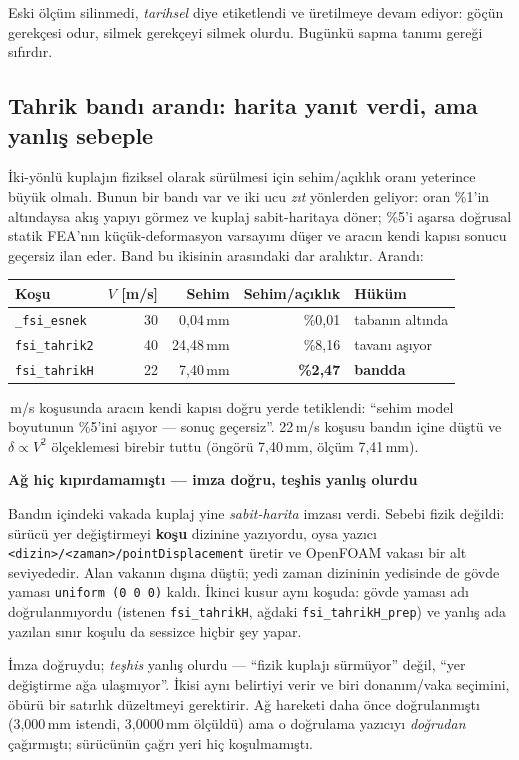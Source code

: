 \documentclass[11pt,a4paper]{article}
\newcommand{\kkkenar}{lacivert}
\newcommand{\kkzemin}{kod}
\newenvironment{renkkutu}[3]{%
  \renewcommand{\kkkenar}{#1}\renewcommand{\kkzemin}{#2}%
  \par\medskip\noindent
  \begin{lrbox}{\kutugovde}%
  \begin{minipage}{\dimexpr\linewidth-2\fboxsep-2\fboxrule\relax}\footnotesize
  \textcolor{#1}{\textbf{#3}}\par\vspace{3pt}%
}{%
  \end{minipage}%
  \end{lrbox}%
  \noindent\fcolorbox{\kkkenar}{\kkzemin}{\usebox{\kutugovde}}%
  \par\medskip
}
\newenvironment{dikkat}[1]{\begin{renkkutu}{orta}{ortabg}{#1}}{\end{renkkutu}}
\begin{document}
\noindent Eski ölçüm silinmedi, \emph{tarihsel} diye etiketlendi ve
üretilmeye devam ediyor: göçün gerekçesi odur, silmek gerekçeyi silmek
olurdu. Bugünkü sapma tanımı gereği sıfırdır.

\subsection{Tahrik bandı arandı: harita yanıt verdi, ama yanlış sebeple}
\label{sub:fsi-tahrik}

İki-yönlü kuplajın fiziksel olarak sürülmesi için sehim/açıklık oranı yeterince
büyük olmalı. Bunun bir bandı var ve iki ucu \emph{zıt} yönlerden geliyor:
oran \%1'in altındaysa akış yapıyı görmez ve kuplaj sabit-haritaya döner; \%5'i
aşarsa doğrusal statik FEA'nın küçük-deformasyon varsayımı düşer ve aracın
kendi kapısı sonucu geçersiz ilan eder. Band bu ikisinin arasındaki dar
aralıktır. Arandı:

\begin{center}\footnotesize
\begin{tabular}{@{}lrrrl@{}}
\toprule
Koşu & $V$ [m/s] & Sehim & Sehim/açıklık & Hüküm \\
\midrule
\texttt{\_fsi\_esnek}   & 30 & 0{,}04\,mm  & \%0{,}01 & tabanın altında \\
\texttt{fsi\_tahrik2}   & 40 & 24{,}48\,mm & \%8{,}16 & tavanı aşıyor \\
\texttt{fsi\_tahrikH}   & 22 & 7{,}40\,mm  & \textbf{\%2{,}47} & \textbf{bandda} \\
\bottomrule
\end{tabular}
\end{center}

\,m/s koşusunda aracın kendi kapısı doğru yerde tetiklendi:
``sehim model boyutunun \%5'ini aşıyor --- sonuç geçersiz''. 22\,m/s koşusu
bandın içine düştü ve $\delta \propto V^2$ ölçeklemesi birebir tuttu
(öngörü 7{,}40\,mm, ölçüm 7{,}41\,mm).

\begin{dikkat}{Ağ hiç kıpırdamamıştı --- imza doğru, teşhis yanlış olurdu}
Bandın içindeki vakada kuplaj yine \emph{sabit-harita} imzası verdi. Sebebi
fizik değildi: sürücü yer değiştirmeyi \textbf{koşu} dizinine yazıyordu, oysa
yazıcı \texttt{<dizin>/<zaman>/pointDisplacement} üretir ve OpenFOAM vakası bir
alt seviyededir. Alan vakanın dışına düştü; yedi zaman dizininin yedisinde de
gövde yaması \texttt{uniform (0 0 0)} kaldı. İkinci kusur aynı koşuda: gövde
yaması adı doğrulanmıyordu (istenen \texttt{fsi\_tahrikH}, ağdaki
\texttt{fsi\_tahrikH\_prep}) ve yanlış ada yazılan sınır koşulu da sessizce
hiçbir şey yapar.

İmza doğruydu; \emph{teşhis} yanlış olurdu --- ``fizik kuplajı sürmüyor''
değil, ``yer değiştirme ağa ulaşmıyor''. İkisi aynı belirtiyi verir ve biri
donanım/vaka seçimini, öbürü bir satırlık düzeltmeyi gerektirir. Ağ hareketi
daha önce doğrulanmıştı (3{,}000\,mm istendi, 3{,}0000\,mm ölçüldü) ama o
doğrulama yazıcıyı \emph{doğrudan} çağırmıştı; sürücünün çağrı yeri hiç
koşulmamıştı.
\end{dikkat}
\end{document}
